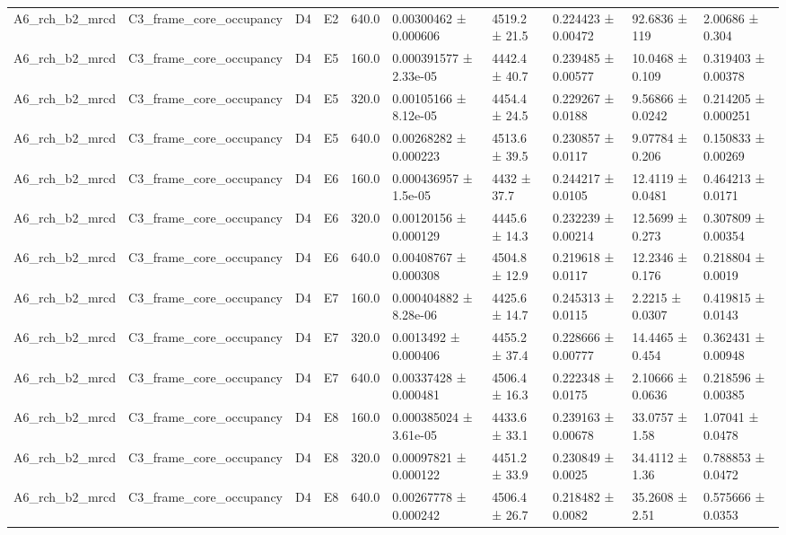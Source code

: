 \begin{table}
\begin{tabular}{llllllllll}
A6\_rch\_b2\_mrcd & C3\_frame\_core\_occupancy & D4 & E2 & 640.0 & 0.00300462 ± 0.000606 & 4519.2 ± 21.5 & 0.224423 ± 0.00472 & 92.6836 ± 119 & 2.00686 ± 0.304 \\
A6\_rch\_b2\_mrcd & C3\_frame\_core\_occupancy & D4 & E5 & 160.0 & 0.000391577 ± 2.33e-05 & 4442.4 ± 40.7 & 0.239485 ± 0.00577 & 10.0468 ± 0.109 & 0.319403 ± 0.00378 \\
A6\_rch\_b2\_mrcd & C3\_frame\_core\_occupancy & D4 & E5 & 320.0 & 0.00105166 ± 8.12e-05 & 4454.4 ± 24.5 & 0.229267 ± 0.0188 & 9.56866 ± 0.0242 & 0.214205 ± 0.000251 \\
A6\_rch\_b2\_mrcd & C3\_frame\_core\_occupancy & D4 & E5 & 640.0 & 0.00268282 ± 0.000223 & 4513.6 ± 39.5 & 0.230857 ± 0.0117 & 9.07784 ± 0.206 & 0.150833 ± 0.00269 \\
A6\_rch\_b2\_mrcd & C3\_frame\_core\_occupancy & D4 & E6 & 160.0 & 0.000436957 ± 1.5e-05 & 4432 ± 37.7 & 0.244217 ± 0.0105 & 12.4119 ± 0.0481 & 0.464213 ± 0.0171 \\
A6\_rch\_b2\_mrcd & C3\_frame\_core\_occupancy & D4 & E6 & 320.0 & 0.00120156 ± 0.000129 & 4445.6 ± 14.3 & 0.232239 ± 0.00214 & 12.5699 ± 0.273 & 0.307809 ± 0.00354 \\
A6\_rch\_b2\_mrcd & C3\_frame\_core\_occupancy & D4 & E6 & 640.0 & 0.00408767 ± 0.000308 & 4504.8 ± 12.9 & 0.219618 ± 0.0117 & 12.2346 ± 0.176 & 0.218804 ± 0.0019 \\
A6\_rch\_b2\_mrcd & C3\_frame\_core\_occupancy & D4 & E7 & 160.0 & 0.000404882 ± 8.28e-06 & 4425.6 ± 14.7 & 0.245313 ± 0.0115 & 2.2215 ± 0.0307 & 0.419815 ± 0.0143 \\
A6\_rch\_b2\_mrcd & C3\_frame\_core\_occupancy & D4 & E7 & 320.0 & 0.0013492 ± 0.000406 & 4455.2 ± 37.4 & 0.228666 ± 0.00777 & 14.4465 ± 0.454 & 0.362431 ± 0.00948 \\
A6\_rch\_b2\_mrcd & C3\_frame\_core\_occupancy & D4 & E7 & 640.0 & 0.00337428 ± 0.000481 & 4506.4 ± 16.3 & 0.222348 ± 0.0175 & 2.10666 ± 0.0636 & 0.218596 ± 0.00385 \\
A6\_rch\_b2\_mrcd & C3\_frame\_core\_occupancy & D4 & E8 & 160.0 & 0.000385024 ± 3.61e-05 & 4433.6 ± 33.1 & 0.239163 ± 0.00678 & 33.0757 ± 1.58 & 1.07041 ± 0.0478 \\
A6\_rch\_b2\_mrcd & C3\_frame\_core\_occupancy & D4 & E8 & 320.0 & 0.00097821 ± 0.000122 & 4451.2 ± 33.9 & 0.230849 ± 0.0025 & 34.4112 ± 1.36 & 0.788853 ± 0.0472 \\
A6\_rch\_b2\_mrcd & C3\_frame\_core\_occupancy & D4 & E8 & 640.0 & 0.00267778 ± 0.000242 & 4506.4 ± 26.7 & 0.218482 ± 0.0082 & 35.2608 ± 2.51 & 0.575666 ± 0.0353 \\

\end{tabular}
\end{table}
